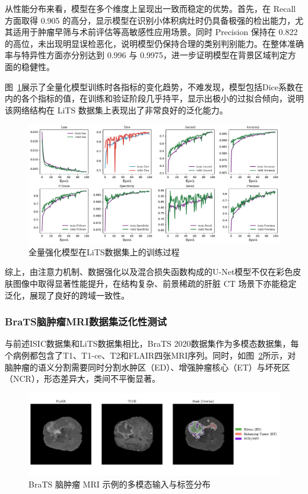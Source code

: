 从性能分布来看，模型在多个维度上呈现出一致而稳定的优势。首先，在 Recall 方面取得 0.905 的高分，显示模型在识别小体积病灶时仍具备极强的检出能力，尤其适用于肿瘤早筛与术前评估等高敏感性应用场景。同时 Precision 保持在 0.822 的高位，未出现明显误检恶化，说明模型仍保持合理的类别判别能力。在整体准确率与特异性方面亦分别达到 0.996 与 0.9975，进一步证明模型在背景区域判定方面的稳健性。

图~\ref{fig:LITS_fanhua}展示了全量化模型训练时各指标的变化趋势，不难发现，模型包括Dice系数在内的各个指标的值，在训练和验证阶段几乎持平，显示出极小的过拟合倾向，说明该网络结构在 LiTS 数据集上表现出了非常良好的泛化能力。

\begin{figure}[!h]
    \centering
    \includegraphics[width=\textwidth]{fig/LITS_fanhua.pdf}
    \caption{全量强化模型在LiTS数据集上的训练过程}
    \label{fig:LITS_fanhua}
\end{figure}

综上，由注意力机制、数据强化以及混合损失函数构成的U-Net模型不仅在彩色皮肤图像中取得显著性能提升，在结构复杂、前景稀疏的肝脏 CT 场景下亦能稳定泛化，展现了良好的跨域一致性。

\subsubsection{BraTS脑肿瘤MRI数据集泛化性测试}

与前述ISIC数据集和LiTS数据集相比，BraTS 2020数据集作为多模态数据集，每个病例都包含了T1、T1-ce、T2和FLAIR四张MRI序列。同时，如图~\ref{fig:final}所示，对脑肿瘤的语义分割需要同时分割水肿区（ED）、增强肿瘤核心（ET）与坏死区（NCR），形态差异大，类间不平衡显著。

\begin{figure}[!h]
    \centering
    \includegraphics[width=\textwidth]{fig/final_3view_with_right_legend.pdf}
    \caption{BraTS 脑肿瘤 MRI 示例的多模态输入与标签分布}
    \label{fig:final}
\end{figure}

